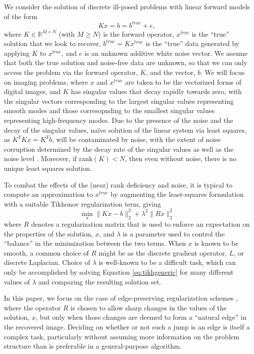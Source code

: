 We consider the solution of discrete ill-posed problems with linear
forward models of the form
\begin{equation}
\label{eq:exact}
K x = b = b^{true} + e,
\end{equation}
where $K \in \mathbb{R}^{M\times N}$ (with $M \geq N$) is the forward
operator, $x^{true}$ is the ``true'' solution that we look to recover,
$b^{true} = Kx^{true}$ is the ``true'' data generated by applying $K$
to $x^{true}$, and $e$ is an unknown additive white noise vector.  We
assume that both the true solution and noise-free data are unknown, so
that we can only access the problem via the forward operator, $K$, and
the vector, $b$.  We will focus on imaging problems, where $x$ and
$x^{true}$ are taken to be the vectorized forms of digital images, and
$K$ has singular values that decay rapidly towards zero, with the
singular vectors corresponding to the largest singular values
representing smooth modes and those corresopnding to the smallest
singular values representing high-frequency modes.  Due to the
presence of the noise and the decay of the singular values, na\"ive
solution of the linear system via least squares, as $K^TK x = K^Tb$,
will be contaminated by noise, with the extent of noise corruption
determined by the decay rate of the singular values as well as the
noise level \cite{Hansenbk}.  Moreover, if $\text{rank}(K)< N$, then
even without noise, there is no unique least squares solution.

To combat the effects of the (near) rank deficiency and noise, it is typical to
compute an approximation to $x^{true}$ by augmenting the least-squares
formulation with a suitable
Tikhonov regularization \cite{Tikhonov} term, giving
\begin{equation}
\label{eq:tikhgeneric}
\min_{x} \| K x - b \|_2^2 + \lambda^2 \| R x \|_2^2
\end{equation}
where $R$ denotes a regularization matrix that is used to enforce an
expectation on the properties of the solution, $x$, and $\lambda$ is a
parameter used to control the ``balance'' in the minimization between
the two terms.  When $x$ is known to be smooth, a common choice of $R$
might be as the discrete gradient operator, $L$, or discrete
Laplacian.  Choice of $\lambda$ is well-known to be a difficult task,
which can only be accomplished by solving
Equation \eqref{eq:tikhgeneric} for many different values of $\lambda$
and comparing the resulting solution set.

In this paper, we focus on the case of edge-preserving regularization
schemes \cite{???}, where the operator $R$ is chosen to allow sharp
changes in the values of the solution, $x$, but only when those
changes are deemed to form a ``natural edge'' in the recovered image.
Deciding on whether or not such a jump is an edge is itself a complex
task, particularly without assuming more information on the problem
structure than is preferable in a general-purpose algorithm.  
